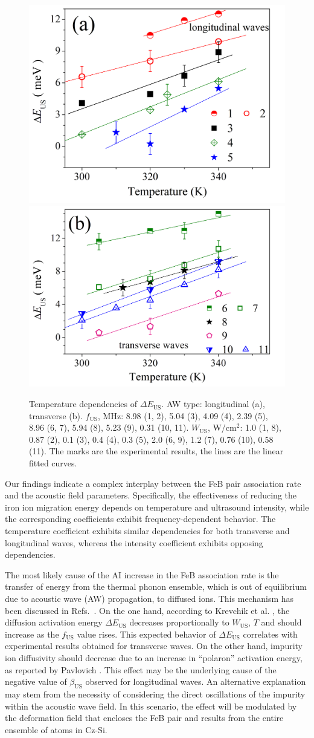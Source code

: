 \documentclass{ttp}
\begin{document}
\begin{figure}
	\centering
     \includegraphics[width=0.4\linewidth]{Fig5a.png}
     \includegraphics[width=0.4\linewidth]{Fig5b.png}
	  \caption{Temperature dependencies of $\Delta E_\mathrm{US}$.
       AW type: longitudinal (a), transverse (b).
       $f_\mathrm{US}$, MHz:  8.98 (1, 2), 5.04 (3),
       4.09 (4), 2.39 (5), 8.96 (6, 7), 5.94 (8), 5.23 (9), 0.31 (10, 11).
       $W_\mathrm{US}$, W/cm$^2$: 1.0 (1, 8), 0.87 (2), 0.1 (3), 0.4 (4), 0.3 (5), 2.0 (6, 9), 1.2 (7),
        0.76 (10), 0.58 (11).
        The marks are the experimental results, the lines are the linear fitted curves.
}\label{fig5}
\end{figure}

Our findings indicate a complex interplay between the FeB pair association rate 
and the acoustic field parameters. 
Specifically, the effectiveness of reducing the iron ion migration energy 
depends on temperature and ultrasound intensity, 
while the corresponding coefficients exhibit frequency-dependent behavior. 
The temperature coefficient exhibits similar dependencies for both transverse and longitudinal waves, 
whereas the intensity coefficient exhibits opposing dependencies.

The most likely cause \cite{Olikh2021JAP} of the AI increase in the FeB association rate 
is the transfer of energy from the thermal phonon ensemble, 
which is out of equilibrium due to acoustic wave (AW) propagation, to diffused ions.
This mechanism has been discussed in Refs.~\cite{Pavlovich, Krevchik}.
On the one hand, according to Krevchik et al. \cite{Krevchik}, 
the diffusion activation energy $\Delta E_\mathrm{US}$ decreases proportionally 
to $W_\mathrm{US}$, $T$ and should increase as the $f_\mathrm{US}$ value rises.
This expected behavior of $\Delta E_\mathrm{US}$  correlates with experimental results obtained for transverse waves.
On the other hand, impurity ion diffusivity should decrease due to an increase in 
``polaron'' activation energy, as reported by Pavlovich \cite{Pavlovich}.
This effect may be the underlying cause of the negative value of $\beta_\mathrm{US}$ observed for longitudinal waves.
An alternative explanation may stem from the necessity of considering the direct oscillations of the impurity within the acoustic wave field.
In this scenario, the effect will be modulated by the deformation field that encloses the FeB pair 
and results from the entire ensemble of atoms in Cz-Si. 
\end{document}
